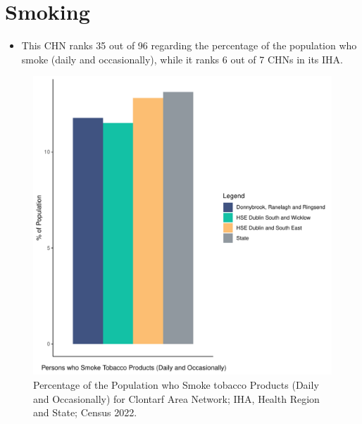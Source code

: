 \documentclass{article}
\begin{document}
\pagebreak

\section{Smoking}\label{sect:Smoking}
\begin{itemize}
\item This CHN ranks  35 out of 96 regarding the percentage of the population who smoke (daily and occasionally), while it ranks   6 out of 7 CHNs in its IHA.
\end{itemize}
\begin{figure}[H]
	\centering
	\includegraphics[width = 120mm]{../figures/SmokingED.pdf}
	\caption{Percentage of the Population who Smoke tobacco Products (Daily and Occasionally) for Clontarf Area Network; IHA, Health Region and State; Census 2022.}
	\label{fig:2ae19629-1a6a-13a3-e055-000000000001}
	\end{figure}
	
\end{document}
